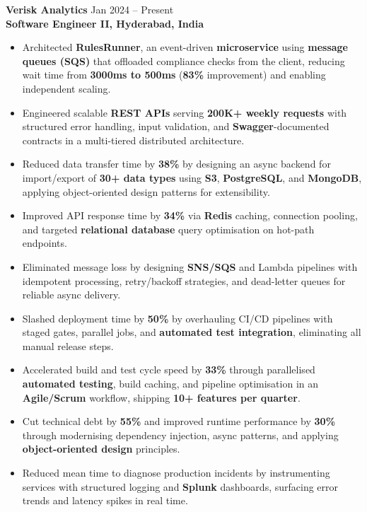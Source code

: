 \documentclass[a4paper,10pt]{article}
\begin{document}
\textbf{Verisk Analytics} \hfill Jan 2024 -- Present \\
\textbf{Software Engineer II, Hyderabad, India}
\begin{itemize}[leftmargin=*]
    \item Architected \textbf{RulesRunner}, an event-driven \textbf{microservice} using \textbf{message queues (SQS)} that offloaded compliance checks from the client, reducing wait time from \textbf{3000ms to 500ms} (\textbf{83\%} improvement) and enabling independent scaling.
    \item Engineered scalable \textbf{REST APIs} serving \textbf{200K+ weekly requests} with structured error handling, input validation, and \textbf{Swagger}-documented contracts in a multi-tiered distributed architecture.
    \item Reduced data transfer time by \textbf{38\%} by designing an async backend for import/export of \textbf{30+ data types} using \textbf{S3}, \textbf{PostgreSQL}, and \textbf{MongoDB}, applying object-oriented design patterns for extensibility.
    \item Improved API response time by \textbf{34\%} via \textbf{Redis} caching, connection pooling, and targeted \textbf{relational database} query optimisation on hot-path endpoints.
    \item Eliminated message loss by designing \textbf{SNS/SQS} and Lambda pipelines with idempotent processing, retry/backoff strategies, and dead-letter queues for reliable async delivery.
    \item Slashed deployment time by \textbf{50\%} by overhauling CI/CD pipelines with staged gates, parallel jobs, and \textbf{automated test integration}, eliminating all manual release steps.
    \item Accelerated build and test cycle speed by \textbf{33\%} through parallelised \textbf{automated testing}, build caching, and pipeline optimisation in an \textbf{Agile/Scrum} workflow, shipping \textbf{10+ features per quarter}.
    \item Cut technical debt by \textbf{55\%} and improved runtime performance by \textbf{30\%} through modernising dependency injection, async patterns, and applying \textbf{object-oriented design} principles.
    \item Reduced mean time to diagnose production incidents by instrumenting services with structured logging and \textbf{Splunk} dashboards, surfacing error trends and latency spikes in real time.
\end{itemize}
\end{document}
